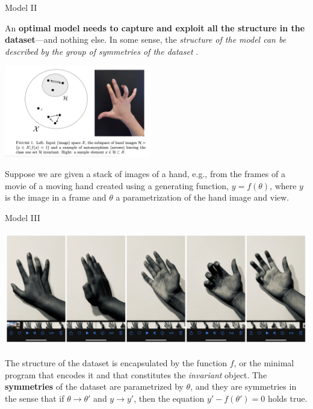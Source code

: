 \begin{frame}[label=ladila]{Model II}

An {\bf optimal model needs to capture and exploit all the structure in the dataset}---and nothing else. In some sense, the {\em structure of the model can be described by the group of symmetries of the dataset}  \citep{Ruffini:2016ad}. 
 \begin{center}%
  \includegraphics[height=4cm]{img/hand2.png}
  \end{center}
  
Suppose we are given a stack of images of a hand, e.g., from the frames of a movie of a moving hand  created using a generating function,
$y = f(\theta)$, where $y$ is the image in a frame and $\theta$ a parametrization of the hand image and view.
\end{frame}

\begin{frame}[label=ladila]{Model III}
 \begin{center}%
  \includegraphics[height=5cm]{img/hands.png}
  \end{center}
  The structure of the dataset is encapsulated by the function $f$, or the minimal program that encodes it and that constitutes the {\em invariant} object.  The {\bf symmetries} of the dataset are parametrized by $\theta$, and they are symmetries in the sense that if $\theta\rightarrow \theta'$ and $y\rightarrow y'$, then the equation $y'-f(\theta') =0 $ holds true.
\end{frame}



